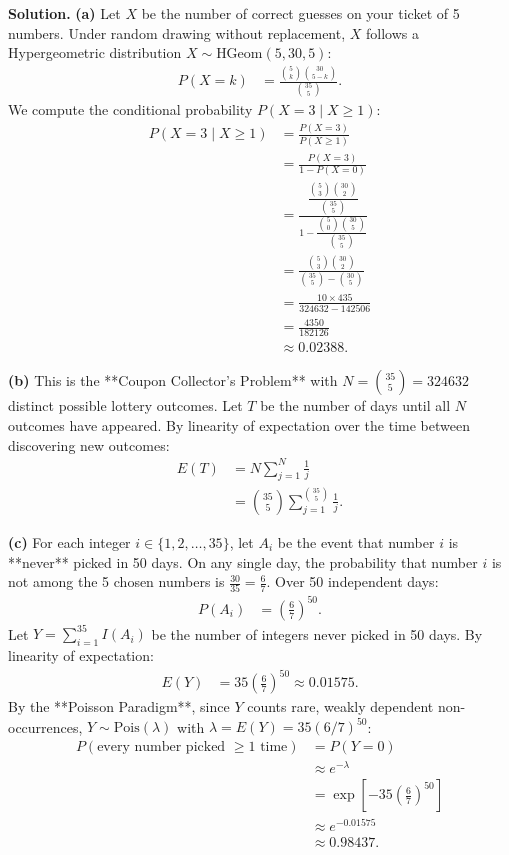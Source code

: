 \documentclass[11pt,a4paper]{article}
\begin{document}
\noindent \textbf{Solution.} \textbf{(a)} Let $X$ be the number of correct guesses on your ticket of 5 numbers. Under random drawing without replacement, $X$ follows a Hypergeometric distribution $X \sim \text{HGeom}(5, 30, 5)$:
\begin{align*}
P(X = k) &= \frac{\binom{5}{k} \binom{30}{5 - k}}{\binom{35}{5}}.
\end{align*}
We compute the conditional probability $P(X = 3 \mid X \ge 1)$:
\begin{align*}
P(X = 3 \mid X \ge 1) &= \frac{P(X = 3)}{P(X \ge 1)} \\
&= \frac{P(X = 3)}{1 - P(X = 0)} \\
&= \frac{\dfrac{\binom{5}{3} \binom{30}{2}}{\binom{35}{5}}}{1 - \dfrac{\binom{5}{0} \binom{30}{5}}{\binom{35}{5}}} \\
&= \frac{\binom{5}{3} \binom{30}{2}}{\binom{35}{5} - \binom{30}{5}} \\
&= \frac{10 \times 435}{324632 - 142506} \\
&= \frac{4350}{182126} \\
&\approx 0.02388.
\end{align*}

\vspace{4pt}
\noindent \textbf{(b)} This is the **Coupon Collector's Problem** with $N = \binom{35}{5} = 324632$ distinct possible lottery outcomes. Let $T$ be the number of days until all $N$ outcomes have appeared. By linearity of expectation over the time between discovering new outcomes:
\begin{align*}
E(T) &= N \sum_{j=1}^{N} \frac{1}{j} \\
&= \binom{35}{5} \sum_{j=1}^{\binom{35}{5}} \frac{1}{j}.
\end{align*}

\vspace{4pt}
\noindent \textbf{(c)} For each integer $i \in \{1, 2, \dots, 35\}$, let $A_i$ be the event that number $i$ is **never** picked in 50 days. On any single day, the probability that number $i$ is not among the 5 chosen numbers is $\frac{30}{35} = \frac{6}{7}$. Over 50 independent days:
\begin{align*}
P(A_i) &= \left(\frac{6}{7}\right)^{50}.
\end{align*}
Let $Y = \sum_{i=1}^{35} I(A_i)$ be the number of integers never picked in 50 days. By linearity of expectation:
\begin{align*}
E(Y) &= 35 \left(\frac{6}{7}\right)^{50} \approx 0.01575.
\end{align*}
By the **Poisson Paradigm**, since $Y$ counts rare, weakly dependent non-occurrences, $Y \sim \text{Pois}(\lambda)$ with $\lambda = E(Y) = 35(6/7)^{50}$:
\begin{align*}
P(\text{every number picked } \ge 1 \text{ time}) &= P(Y = 0) \\
&\approx e^{-\lambda} \\
&= \exp\left[ -35 \left(\frac{6}{7}\right)^{50} \right] \\
&\approx e^{-0.01575} \\
&\approx 0.98437.
\end{align*}
\end{document}

